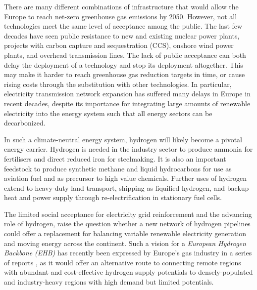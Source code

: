 
There are many different combinations of infrastructure that would allow the
Europe to reach net-zero greenhouse gas emissions by 2050. However, not all
technologies meet the same level of acceptance among the public. The last few
decades have seen public resistance to new and existing nuclear power plants,
projects with carbon capture and sequestration (CCS), onshore wind power plants,
and overhead transmission lines. The lack of public acceptance can both delay
the deployment of a technology and stop its deployment altogether. This may make
it harder to reach greenhouse gas reduction targets in time, or cause rising
costs through the substitution with other technologies. In particular,
electricity transmission network expansion has suffered many delays in Europe in
recent decades, despite its importance for integrating large amounts of
renewable electricity into the energy system such that all energy sectors can be
decarbonized.


In such a climate-neutral energy system, hydrogen will likely become a pivotal
energy carrier. Hydrogen is needed in the industry sector to produce ammonia for
fertilisers and direct reduced iron for steelmaking. It is also an important
feedstock to produce synthetic methane and liquid hydrocarbons for use as
aviation fuel and as precursor to high value chemicals. Further uses of hydrogen
extend to heavy-duty land transport, shipping as liquified hydrogen, and backup
heat and power supply through re-electrification in stationary fuel cells.


The limited social acceptance for electricity grid reinforcement and the
advancing role of hydrogen, raise the question whether a new network of hydrogen
pipelines could offer a replacement for balancing variable renewable electricity
generation and moving energy across the continent. Such a vision for a
\textit{European Hydrogen Backbone (EHB)} has recently been expressed by
Europe's gas industry in a series of reports
\cite{gasforclimateEuropeanHydrogen2020,gasforclimateEuropeanHydrogen2021,gasforclimateExtendingEuropean2021,gasforclimateEuropeanHydrogen2022},
as it would offer an alternative route to connecting remote regions with
abundant and cost-effective hydrogen supply potentials to densely-populated and
industry-heavy regions with high demand but limited potentials.

